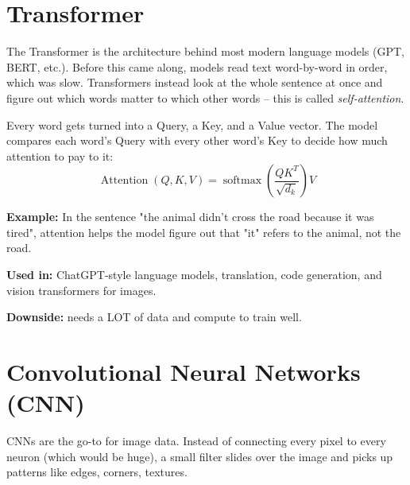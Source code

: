 \documentclass[11pt]{article}
\begin{document}
\vspace{0.3cm}

\section{Transformer}

The Transformer is the architecture behind most modern language models (GPT, BERT, etc.). Before this came along, models read text word-by-word in order, which was slow. Transformers instead look at the whole sentence at once and figure out which words matter to which other words -- this is called \textit{self-attention}.

Every word gets turned into a Query, a Key, and a Value vector. The model compares each word's Query with every other word's Key to decide how much attention to pay to it:
\[
\operatorname{Attention}(Q,K,V) = \operatorname{softmax}\!\left(\frac{QK^T}{\sqrt{d_k}}\right)V
\]

\begin{figure}[H]
\centering
{}
\end{figure}

\textbf{Example:} In the sentence "the animal didn't cross the road because it was tired", attention helps the model figure out that "it" refers to the animal, not the road.

\textbf{Used in:} ChatGPT-style language models, translation, code generation, and vision transformers for images.

\textbf{Downside:} needs a LOT of data and compute to train well.

\section{Convolutional Neural Networks (CNN)}

CNNs are the go-to for image data. Instead of connecting every pixel to every neuron (which would be huge), a small filter slides over the image and picks up patterns like edges, corners, textures.
\end{document}
